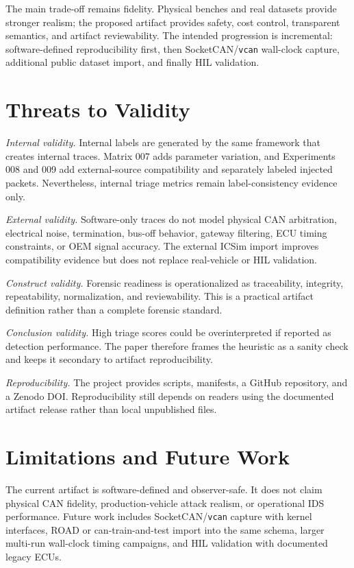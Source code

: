 \documentclass[conference]{IEEEtran}
\begin{document}
The main trade-off remains fidelity. Physical benches and real datasets provide stronger realism; the proposed artifact provides safety, cost control, transparent semantics, and artifact reviewability. The intended progression is incremental: software-defined reproducibility first, then SocketCAN/\texttt{vcan} wall-clock capture, additional public dataset import, and finally HIL validation.

\section{Threats to Validity}
\textit{Internal validity.} Internal labels are generated by the same framework that creates internal traces. Matrix 007 adds parameter variation, and Experiments 008 and 009 add external-source compatibility and separately labeled injected packets. Nevertheless, internal triage metrics remain label-consistency evidence only.

\textit{External validity.} Software-only traces do not model physical CAN arbitration, electrical noise, termination, bus-off behavior, gateway filtering, ECU timing constraints, or OEM signal accuracy. The external ICSim import improves compatibility evidence but does not replace real-vehicle or HIL validation.

\textit{Construct validity.} Forensic readiness is operationalized as traceability, integrity, repeatability, normalization, and reviewability. This is a practical artifact definition rather than a complete forensic standard.

\textit{Conclusion validity.} High triage scores could be overinterpreted if reported as detection performance. The paper therefore frames the heuristic as a sanity check and keeps it secondary to artifact reproducibility.

\textit{Reproducibility.} The project provides scripts, manifests, a GitHub repository, and a Zenodo DOI. Reproducibility still depends on readers using the documented artifact release rather than local unpublished files.

\section{Limitations and Future Work}
The current artifact is software-defined and observer-safe. It does not claim physical CAN fidelity, production-vehicle attack realism, or operational IDS performance. Future work includes SocketCAN/\texttt{vcan} capture with kernel interfaces, ROAD or can-train-and-test import into the same schema, larger multi-run wall-clock timing campaigns, and HIL validation with documented legacy ECUs.
\end{document}
